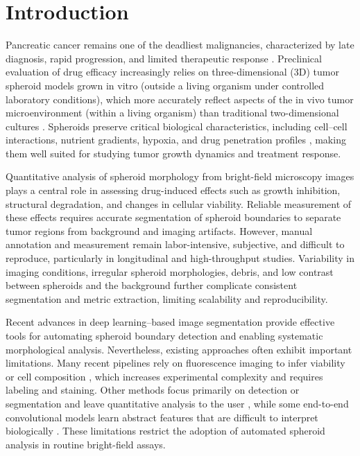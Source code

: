 \documentclass[sigconf, nonacm]{acmart}
\begin{document}
\section{Introduction}\label{introduction}
Pancreatic cancer remains one of the deadliest malignancies, characterized by late diagnosis, rapid progression, and limited therapeutic response \cite{ref12}. Preclinical evaluation of drug efficacy increasingly relies on three-dimensional (3D) tumor spheroid models grown in vitro (outside a living organism under controlled laboratory conditions), which more accurately reflect aspects of the in vivo tumor microenvironment (within a living organism) than traditional two-dimensional cultures \cite{ref1}. Spheroids preserve critical biological characteristics, including cell–cell interactions, nutrient gradients, hypoxia, and drug penetration profiles \cite{ref1}, making them well suited for studying tumor growth dynamics and treatment response.

Quantitative analysis of spheroid morphology from bright-field microscopy images plays a central role in assessing drug-induced effects such as growth inhibition, structural degradation, and changes in cellular viability. Reliable measurement of these effects requires accurate segmentation of spheroid boundaries to separate tumor regions from background and imaging artifacts. However, manual annotation and measurement remain labor-intensive, subjective, and difficult to reproduce, particularly in longitudinal and high-throughput studies. Variability in imaging conditions, irregular spheroid morphologies, debris, and low contrast between spheroids and the background further complicate consistent segmentation and metric extraction, limiting scalability and reproducibility.

Recent advances in deep learning–based image segmentation provide effective tools for automating spheroid boundary detection and enabling systematic morphological analysis. Nevertheless, existing approaches often exhibit important limitations. Many recent pipelines rely on fluorescence imaging to infer viability or cell composition \cite{ref3,ref8}, which increases experimental complexity and requires labeling and staining. Other methods focus primarily on detection or segmentation and leave quantitative analysis to the user \cite{ref4}, while some end-to-end convolutional models learn abstract features that are difficult to interpret biologically \cite{ref9}. These limitations restrict the adoption of automated spheroid analysis in routine bright-field assays.
\end{document}
